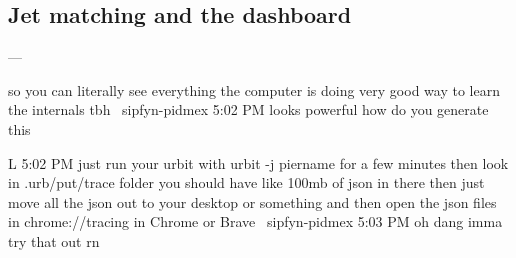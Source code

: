 \subsection{Jet matching and the dashboard}

---

so you can literally see everything the computer is doing
very good way to learn the internals tbh
~sipfyn-pidmex
5:02 PM
looks powerful
how do you generate this

L
5:02 PM
just run your urbit with urbit -j piername
for a few minutes
then look in .urb/put/trace folder
you should have like 100mb of json in there
then just move all the json out to your desktop or something
and then open the json files in chrome://tracing in Chrome or Brave
~sipfyn-pidmex
5:03 PM
oh dang
imma try that out rn
